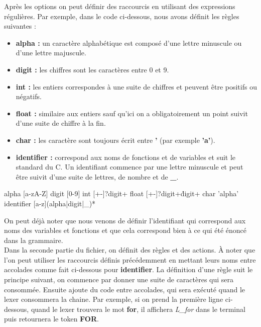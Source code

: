 \documentclass[a4paper]{article}%
\begin{document}
Après les options on peut définir des raccourcis en utilisant des expressions
régulières. Par exemple, dans le code ci-dessous, nous avons définit les règles
suivantes :

\begin{itemize}
  \item \textbf{alpha :} un caractère alphabétique est composé d'une lettre
    minuscule ou d'une lettre majuscule.
  \item \textbf{digit :} les chiffres sont les caractères entre 0 et 9.
  \item \textbf{int :} les entiers correspondes à une suite de chiffres et
    peuvent être positifs ou négatifs.
  \item \textbf{float :} similaire aux entiers sauf qu'ici on a obligatoirement
    un point suivit d'une suite de chiffre à la fin.
  \item \textbf{char :} les caractère sont toujours écrit entre \textbf{'} (par
    exemple \textbf{'a'}).
  \item \textbf{identifier :} correspond aux noms de fonctions et de variables
    et suit le standard du C. Un identifiant commence par une lettre minuscule
    et peut être suivit d'une suite de lettres, de nombre et de \textbf{\_}.
\end{itemize}

\begin{code}
alpha [a-zA-Z]
digit [0-9]
int [+-]?{digit}+
float [+-]?{digit}+\.{digit}+
char '{alpha}'
identifier [a-z]({alpha}|{digit}|_)*
\end{code}\leavevmode\newline

\noindent

On peut déjà noter que nous venons de définir l'identifiant qui correspond aux
noms des variables et fonctions et que cela correspond bien à ce qui été énoncé
dans la grammaire.\\

Dans la seconde partie du fichier, on définit des règles et des actions. À noter
que l'on peut utiliser les raccourcis définis précédemment en mettant leurs noms
entre accolades comme fait ci-dessous pour \textbf{identifier}. La définition
d'une règle suit le principe suivant, on commence par donner une suite de
caractères qui sera consommée. Ensuite ajoute du code entre accolades, qui
sera exécuté quand le \gls{lexer} consommera la chaine. Par exemple, si on prend la
première ligne ci-dessous, quand le \gls{lexer} trouvera le mot \textbf{for}, il
affichera \textit{L\_for} dans le terminal puis retournera le token \textbf{FOR}.
\end{document}
